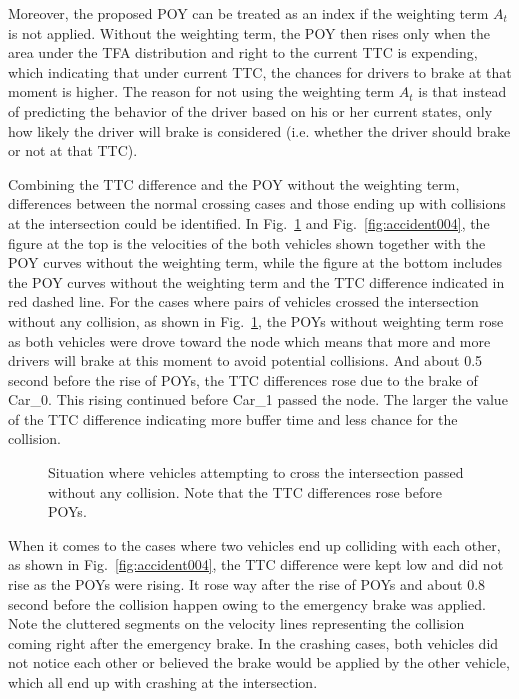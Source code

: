 Moreover, the proposed POY can be treated as an index if the weighting term $A_t$ is not applied. Without the weighting term, the POY then rises only when the area under the TFA distribution and right to the current TTC is expending, which indicating that under current TTC, the chances for drivers to brake at that moment is higher. The reason for not using the weighting term $A_t$ is that instead of predicting the behavior of the driver based on his or her current states, only how likely the driver will brake is considered (i.e. whether the driver should brake or not at that TTC).


Combining the TTC difference and the POY without the weighting term, differences between the normal crossing cases and those ending up with collisions at the intersection could be identified. In Fig.~\ref{fig:normal003} and Fig.~\ref{fig:accident004}, the figure at the top is the velocities of the both vehicles shown together with the POY curves without the weighting term, while the figure at the bottom includes the POY curves without the weighting term and the TTC difference indicated in red dashed line. For the cases where pairs of vehicles crossed the intersection without any collision, as shown in Fig.~\ref{fig:normal003}, the POYs without weighting term rose as both vehicles were drove toward the node which means that more and more drivers will brake at this moment to avoid potential collisions. And about 0.5 second before the rise of POYs, the TTC differences rose due to the brake of Car\_0. This rising continued before Car\_1 passed the node. The larger the value of the TTC difference indicating more buffer time and less chance for the collision.


\begin{figure}[htbp!]
\begin{center}
\end{center}
\caption{Situation where vehicles attempting to cross the intersection passed without any collision. Note that the TTC differences rose before POYs.}
\label{fig:normal003} 
\end{figure}


When it comes to the cases where two vehicles end up colliding with each other, as shown in Fig.~\ref{fig:accident004}, the TTC difference were kept low and did not rise as the POYs were rising. It rose way after the rise of POYs and about 0.8 second before the collision happen owing to the emergency brake was applied. Note the cluttered segments on the velocity lines representing the collision coming right after the emergency brake. In the crashing cases, both vehicles did not notice each other or believed the brake would be applied by the other vehicle, which all end up with crashing at the intersection.

